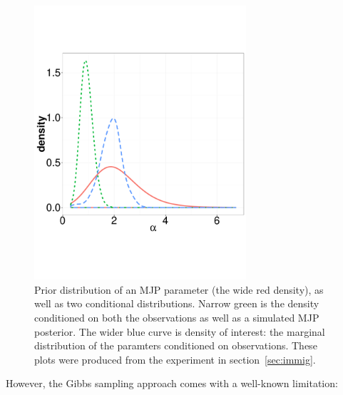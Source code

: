   \begin{figure}%
  \centering
  \begin{minipage}[hp]{0.44\linewidth}
  \centering
    \vspace{-0 in}
    \includegraphics [width=0.7\textwidth, angle=0]{figs/hist_alpha.pdf}
    \vspace{-0 in}
  \end{minipage}
  \begin{minipage}[hp]{0.55\linewidth}
    \vspace{-0.3 in}
  \caption{Prior distribution of an MJP parameter (the wide red density),
  as well as two conditional distributions. Narrow green is the
density conditioned on both the observations as well as a simulated
MJP posterior. The wider blue curve is density of interest: the
marginal distribution of the paramters conditioned on observations. These
plots were produced from the experiment in section~\ref{sec:immig}.}
     \label{fig:hist}
  \end{minipage}
    \vspace{-0.6 in}
  \end{figure}
  However, the Gibbs sampling approach %
  comes with a well-known limitation:
